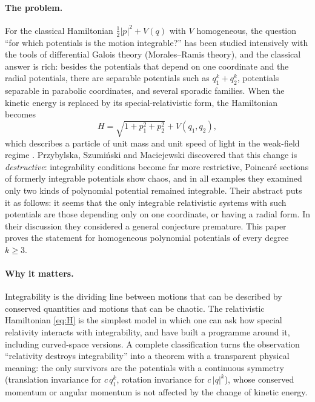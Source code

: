 \documentclass[11pt]{article}
\numberwithin{equation}{section}
\theoremstyle{definition}
\theoremstyle{remark}
\begin{document}
\paragraph{The problem.}
For the classical Hamiltonian $\tfrac12|p|^2+V(q)$ with $V$ homogeneous, the question ``for which potentials is the
motion integrable?'' has been studied intensively with the tools of differential Galois theory (Morales--Ramis
theory), and the classical answer is rich: besides the potentials that depend on one coordinate and the radial
potentials, there are separable potentials such as $q_1^k+q_2^k$, potentials separable in parabolic coordinates,
and several sporadic families. When the kinetic energy is replaced by its special-relativistic form, the
Hamiltonian becomes
\begin{equation}\label{eq:H}
H=\sqrt{1+p_1^2+p_2^2}+V(q_1,q_2),
\end{equation}
which describes a particle of unit mass and unit speed of light in the weak-field regime
\cite{PSM23}. Przybylska, Szumi\'nski and Maciejewski \cite{PSM23} discovered that this change is
\emph{destructive}: integrability conditions become far more restrictive, Poincar\'e sections of formerly integrable
potentials show chaos, and in all examples they examined only two kinds of polynomial potential remained integrable.
Their abstract puts it as follows: it seems that the only integrable relativistic systems with such potentials are
those depending only on one coordinate, or having a radial form. In their discussion they considered a general
conjecture premature. This paper proves the statement for homogeneous polynomial potentials of every degree
$k\ge3$.

\paragraph{Why it matters.}
Integrability is the dividing line between motions that can be described by conserved quantities and motions that
can be chaotic. The relativistic Hamiltonian \eqref{eq:H} is the simplest model in which one can ask how special
relativity interacts with integrability, and \cite{PSM23,SPM24,SP25} have built a programme around it, including
curved-space versions. A complete classification turns the observation ``relativity destroys integrability'' into a
theorem with a transparent physical meaning: the only survivors are the potentials with a continuous symmetry
(translation invariance for $c\,q_1^k$, rotation invariance for $c\,|q|^k$), whose conserved momentum or angular
momentum is not affected by the change of kinetic energy.
\end{document}
